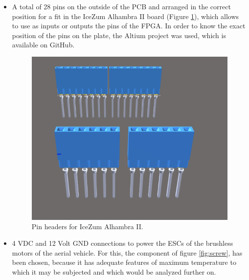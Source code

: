 \begin{itemize}
	\item A total of 28 pins on the outside of the PCB and arranged in the correct position for a fit in the IceZum Alhambra II board (Figure \ref{fig:pin_headers}), which allows to use as inputs or outputs the pins of the FPGA. In order to know the exact position of the pins on the plate, the Altium project was used, which is available on GitHub.
	
	\begin{figure}[H]
		\center
		\includegraphics[scale=0.4]{imagenes/Balancing_robot/pin_headers.PNG}
		\caption{Pin headers for IceZum Alhambra II.}
		\label{fig:pin_headers}
	\end{figure}
	
	
	\item 4 VDC and 12 Volt GND connections to power the ESCs of the brushless motors of the aerial vehicle. For this, the component of figure \ref{fig:screw}, has been chosen, because it has adequate features of maximum temperature to which it may be subjected and which would be analyzed further on.
	

\end{itemize}
